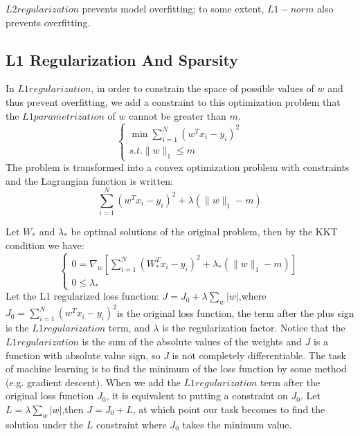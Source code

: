 $L2 regularization$ prevents model overfitting; to some extent, $L1-norm$ also prevents overfitting.

\subsection{L1 Regularization And Sparsity}

In $L1 regularization$, in order to constrain the space of possible values of $w$ and thus prevent overfitting, we add a constraint to this optimization problem that the $L1 parametrization$ of $w$ cannot be greater than $m$.
$$
\left\{\begin{array}{l}
	\min \sum_{i=1}^{N}\left(w^{T} x_{i}-y_{i}\right)^{2} \\
	s . t .\|w\|_{1} \leqslant m
\end{array}\right.
$$
The problem is transformed into a convex optimization problem with constraints and the Lagrangian function is written:
$$
\sum_{i=1}^{N}\left(w^{T} x_{i}-y_{i}\right)^{2}+\lambda\left(\|w\|_{1}-m\right)
$$

Let $W_{*}$  and $\lambda_{*}$ be optimal solutions of the original problem, then by the KKT condition we have:
$$
\left\{\begin{array}{l}
	0=\nabla_{w}\left[\sum_{i=1}^{N}\left(W_{*}^{T} x_{i}-y_{i}\right)^{2}+\lambda_{*}\left(\|w\|_{1}-m\right)\right] \\
	0 \leqslant \lambda_{*}
\end{array}\right.
$$
Let the L1 regularized loss function: $
J=J_{0}+\lambda \sum_{w}|w|$,where$J_{0}=\sum_{i=1}^{N}\left(w^{T} x_{i}-y_{i}\right)^{2}$is the original loss function, the term after the plus sign is the $L1 regularization$ term, and $\lambda$ is the regularization factor.
Notice that the $L1 regularization$ is the sum of the absolute values of the weights and $J$ is a function with absolute value sign, so $J$ is not completely differentiable. The task of machine learning is to find the minimum of the loss function by some method (e.g. gradient descent). When we add the $L1 regularization$ term after the original loss function $J_{0}$, it is equivalent to putting a constraint on $J_{0}$. Let $
L=\lambda \sum_{w}|w|$,then $J=J_{0}+L
$, at which point our task becomes to find the solution under the $L$ constraint where $J_{0}$ takes the minimum value.


